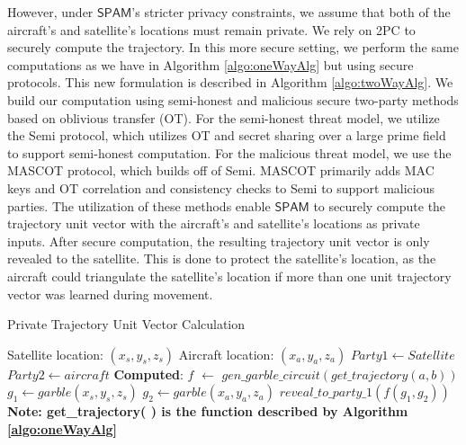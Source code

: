 \documentclass[9pt,sigconf,screen]{acmart}
\newcommand\sys{$\mathsf{SPAM}$\xspace}
\begin{document}


However, under \sys's stricter privacy constraints, we assume that both of the aircraft's and satellite's locations must remain private.  We rely on 2PC to securely compute the trajectory. In this more secure setting, we perform the same computations as we have in Algorithm \ref{algo:oneWayAlg} but using secure protocols. This new formulation is described in Algorithm \ref{algo:twoWayAlg}. We build our computation using semi-honest and malicious secure two-party methods based on oblivious transfer (OT). For the semi-honest threat model, we utilize the Semi \cite{mpspdz} protocol, which utilizes OT and secret sharing over a large prime field to support semi-honest computation. For the malicious threat model, we use the MASCOT \cite{mascot} protocol, which builds off of Semi. MASCOT primarily adds MAC keys and OT correlation and consistency checks to Semi to support malicious parties.
The utilization of these methods enable \sys to securely compute the trajectory unit vector with the aircraft's and satellite's locations as private inputs. After secure computation, the resulting trajectory unit vector is only revealed to the satellite. This is done to protect the satellite's location, as the aircraft could triangulate the satellite's location if more than one unit trajectory vector was learned during movement.

\begin{algorithm}
\caption{Private Trajectory Unit Vector Calculation}
\label{algo:twoWayAlg}

\begin{algorithmic}
\STATE Satellite location: $(x_s, y_s, z_s)$
\STATE Aircraft location: $(x_a, y_a, z_a)$
\STATE $Party 1 \leftarrow Satellite$
\STATE $Party 2 \leftarrow aircraft$
\STATE \textbf{Computed}:
\STATE $f$ $\leftarrow$ $gen\_garble\_circuit(get\_trajectory(a, b))$
\STATE $g_1 \leftarrow{garble} (x_s, y_s, z_s)$
\STATE $g_2 \leftarrow{garble} (x_a, y_a, z_a)$
\STATE $reveal\_to\_party\_1(f(g_1, g_2))$
\STATE \textbf{Note: get\_trajectory( ) is the function described by Algorithm \ref{algo:oneWayAlg}}
\end{algorithmic}

\end{algorithm}
\end{document}

